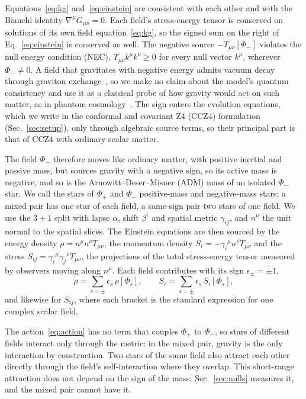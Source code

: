 \documentclass[twocolumn,floatfix,aps,prd,superscriptaddress,nofootinbib]{revtex4-2}
\begin{document}
Equations~\eqref{eq:kg} and~\eqref{eq:einstein} are consistent with each other and with the Bianchi identity $\nabla^\mu G_{\mu\nu}=0$. Each field's stress-energy tensor is conserved on solutions of its own field equation~\eqref{eq:kg}, so the signed sum on the right of Eq.~\eqref{eq:einstein} is conserved as well. The negative source $-T_{\mu\nu}[\Phi_-]$ violates the null energy condition (NEC), $T_{\mu\nu}k^\mu k^\nu\ge0$ for every null vector $k^\mu$, wherever $\Phi_-\neq0$. A field that gravitates with negative energy admits vacuum decay through graviton exchange~\cite{carroll2003,cline2004}, so we make no claim about the model's quantum consistency and use it as a classical probe of how gravity would act on such matter, as in phantom cosmology~\cite{caldwell2002}. The sign enters the evolution equations, which we write in the conformal and covariant Z4 (CCZ4) formulation (Sec.~\ref{sec:setup}), only through algebraic source terms, so their principal part is that of CCZ4 with ordinary scalar matter.

The field $\Phi_-$ therefore moves like ordinary matter, with positive inertial and passive mass, but sources gravity with a negative sign, so its active mass is negative, and so is the Arnowitt--Deser--Misner (ADM) mass of an isolated $\Phi_-$ star. We call the stars of $\Phi_+$ and $\Phi_-$ positive-mass and negative-mass stars; a mixed pair has one star of each field, a same-sign pair two stars of one field. We use the $3{+}1$ split with lapse $\alpha$, shift $\beta^i$ and spatial metric $\gamma_{ij}$, and $n^\mu$ the unit normal to the spatial slices. The Einstein equations are then sourced by the energy density $\rho=n^\mu n^\nu T_{\mu\nu}$, the momentum density $S_i=-\gamma_i{}^\mu n^\nu T_{\mu\nu}$ and the stress $S_{ij}=\gamma_i{}^\mu\gamma_j{}^\nu T_{\mu\nu}$, the projections of the total stress-energy tensor measured by observers moving along $n^\mu$. Each field contributes with its sign $\epsilon_\pm=\pm1$,
\begin{equation}
\rho=\sum_{s=\pm}\epsilon_s\,\rho[\Phi_s],\qquad
S_i=\sum_{s=\pm}\epsilon_s\,S_i[\Phi_s],
\label{eq:adm_sources}
\end{equation}
and likewise for $S_{ij}$, where each bracket is the standard expression for one complex scalar field.

The action~\eqref{eq:action} has no term that couples $\Phi_+$ to $\Phi_-$, so stars of different fields interact only through the metric: in the mixed pair, gravity is the only interaction by construction. Two stars of the same field also attract each other directly through the field's self-interaction where they overlap. This short-range attraction does not depend on the sign of the mass; Sec.~\ref{sec:nulls} measures it, and the mixed pair cannot have it.
\end{document}

